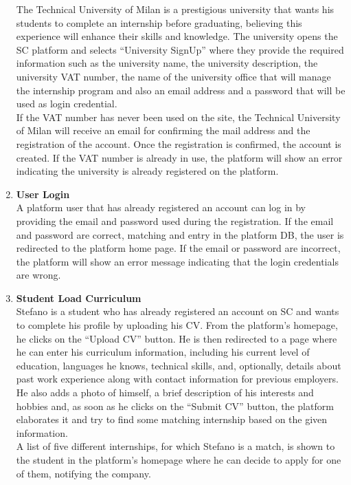 \begin{enumerate}
        The Technical University of Milan is a prestigious university that wants his students to complete an internship before graduating, believing this experience will enhance their skills and knowledge. The university opens the SC platform and selects “University SignUp” where they provide the required information such as the university name, the university description, the university VAT number, the name of the university office that will manage the internship program and also an email address and a password that will be used as login credential.\\
        If the VAT number has never been used on the site, the Technical University of Milan will receive an email for confirming the mail address and the registration of the account. Once the registration is confirmed, the account is created.
        If the VAT number is already in use, the platform will show an error indicating the university is already registered on the platform.
    \item \textbf{\textcolor{titleColor}{User Login}}\\
        A platform user that has already registered an account can log in by providing the email and password used during the registration. If the email and password are correct, matching and entry in the platform DB, the user is redirected to the platform home page. If the email or password are incorrect, the platform will show an error message indicating that the login credentials are wrong.
    \item \textbf{\textcolor{titleColor}{Student Load Curriculum}}\\
        Stefano is a student who has already registered an account on SC and wants to complete his profile by uploading his CV. From the platform's homepage, he clicks on the “Upload CV” button. He is then redirected to a page where he can enter his curriculum information, including his current level of education, languages he knows, technical skills, and, optionally, details about past work experience along with contact information for previous employers.
        He also adds a photo of himself, a brief description of his interests and hobbies and, as soon as he clicks on the “Submit CV” button, the platform elaborates it and try to find some matching internship based on the given information.\\
        A list of five different internships, for which Stefano is a match, is shown to the student in the platform's homepage where he can decide to apply for one of them, notifying the company.

\end{enumerate}
